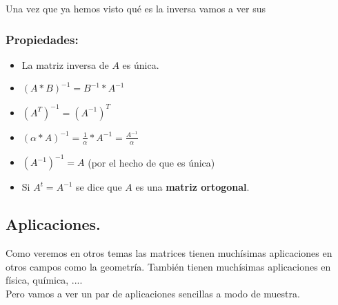 \documentclass[a4paper,11pt,answers]{exam}
\begin{document}
Una vez que ya hemos visto qué es la inversa vamos a ver sus
\subsubsection{Propiedades:}
\begin{itemize}
	\item La matriz inversa de $A$ es única.
	\item $(A*B)^{-1} = B^{-1}*A^{-1}$
	\item $\left(A^T\right)^{-1} = \left(A^{-1}\right)^T$
	\item $(\alpha*A)^{-1} = \frac{1}{\alpha} * A^{-1} = \frac{A^{-1}}{\alpha}$
	\item $\left(A^{-1}\right)^{-1} = A$ (por el hecho de que es única)
	\item Si $A^t = A^{-1}$ se dice que $A$ es una \textbf{matriz ortogonal}.
\end{itemize}
\subsection{Aplicaciones.}
Como veremos en otros temas las matrices tienen muchísimas aplicaciones en otros campos como la geometría. También tienen muchísimas aplicaciones en física, química, ....\\

Pero vamos a ver un par de aplicaciones sencillas a modo de muestra.
\end{document}
